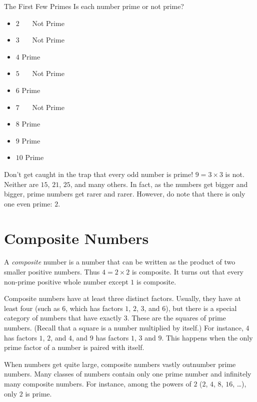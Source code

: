 \documentclass[a4paper,10pt]{report}
\begin{document}
\begin{problem}{The First Few Primes}
 Is each number prime or not prime?

 \begin{itemize}
  \item \(2\) \hfill {}~~~Not Prime
  \item \(3\) \hfill {}~~~Not Prime
  \item \(4\) \hfill Prime~~~
  \item \(5\) \hfill {}~~~Not Prime
  \item \(6\) \hfill Prime~~~
  \item \(7\) \hfill {}~~~Not Prime
  \item \(8\) \hfill Prime~~~
  \item \(9\) \hfill Prime~~~
  \item \(10\) \hfill Prime~~~
 \end{itemize}
\end{problem}

Don't get caught in the trap that every odd number is prime! \(9=3\times3\) is
not. Neither are \(15\), \(21\), \(25\), and many others. In fact, as the
numbers get bigger and bigger, prime numbers get rarer and rarer. However, do
note that there is only one even prime: \(2\).

\section{Composite Numbers}

A \emph{composite} number is a number that can be written as the product of two
smaller positive numbers. Thus \(4=2\times2\) is composite. It turns out that
every non-prime positive whole number except \(1\) is composite.

Composite numbers have at least three distinct factors. Usually, they have at
least four (such as \(6\), which has factors \(1\), \(2\), \(3\), and \(6\)),
but there is a special category of numbers that have exactly \(3\). These are
the squares of prime numbers. (Recall that a square is a number multiplied by
itself.) For instance, \(4\) has factors \(1\), \(2\), and \(4\), and \(9\) has
factors \(1\), \(3\) and \(9\). This happens when the only prime factor of a
number is paired with itself.

When numbers get quite large, composite numbers vastly outnumber prime numbers.
Many classes of numbers contain only one prime number and infinitely many
composite numbers. For instance, among the powers of \(2\) (\(2\), \(4\),
\(8\), \(16\), \dots), only \(2\) is prime.
\end{document}
